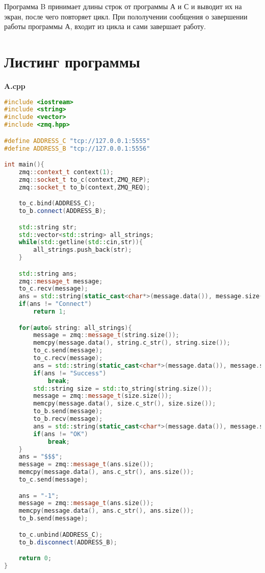 \documentclass[pdf, unicode, 12pt, a4paper,oneside,fleqn]{article}
\begin{document}
Программа B принимает длины строк от программы А и С и выводит их на экран, после чего повторяет цикл. При пололучении сообщения о завершении работы программы А, входит из цикла и сами завершает работу. 


\section{Листинг программы}

{\large\textbf{A.cpp}}

\begin{lstlisting}[language=C++]
#include <iostream>
#include <string>
#include <vector>
#include <zmq.hpp>

#define ADDRESS_C "tcp://127.0.0.1:5555"
#define ADDRESS_B "tcp://127.0.0.1:5556"

int main(){
    zmq::context_t context(1);
    zmq::socket_t to_c(context,ZMQ_REP);
    zmq::socket_t to_b(context,ZMQ_REQ);

    to_c.bind(ADDRESS_C);
    to_b.connect(ADDRESS_B);

    std::string str;
    std::vector<std::string> all_strings;
    while(std::getline(std::cin,str)){
        all_strings.push_back(str);
    }

    std::string ans;
    zmq::message_t message;
    to_c.recv(message);
    ans = std::string(static_cast<char*>(message.data()), message.size());
    if(ans != "Connect")
        return 1;

    for(auto& string: all_strings){
        message = zmq::message_t(string.size());
        memcpy(message.data(), string.c_str(), string.size());
        to_c.send(message);
        to_c.recv(message);
        ans = std::string(static_cast<char*>(message.data()), message.size());
        if(ans != "Success")
            break;
        std::string size = std::to_string(string.size());
        message = zmq::message_t(size.size());
        memcpy(message.data(), size.c_str(), size.size());
        to_b.send(message);
        to_b.recv(message);
        ans = std::string(static_cast<char*>(message.data()), message.size());
        if(ans != "OK")
            break;
    }
    ans = "$$$";
    message = zmq::message_t(ans.size());
    memcpy(message.data(), ans.c_str(), ans.size());
    to_c.send(message);

    ans = "-1";
    message = zmq::message_t(ans.size());
    memcpy(message.data(), ans.c_str(), ans.size());
    to_b.send(message);

    to_c.unbind(ADDRESS_C);
    to_b.disconnect(ADDRESS_B);

    return 0;
}
\end{lstlisting}
\end{document}
